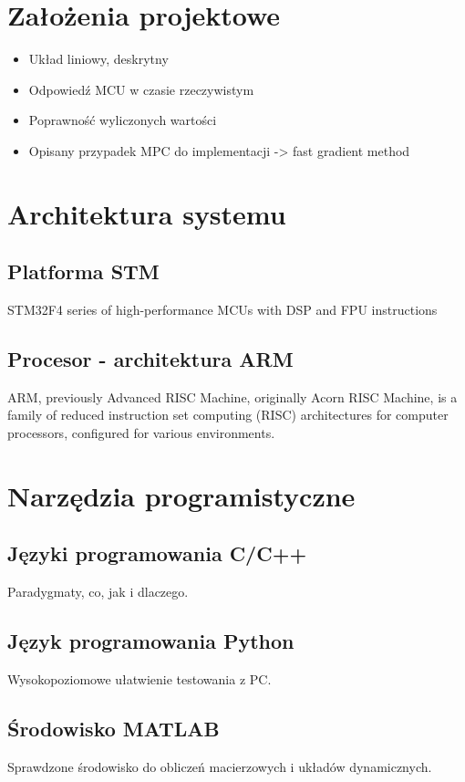 \section{Założenia projektowe} \label{sec:assumptions}
\begin{itemize}
	\item Układ liniowy, deskrytny
	\item Odpowiedź MCU w czasie rzeczywistym
    \item Poprawność wyliczonych wartości
    \item Opisany przypadek MPC do implementacji -> fast gradient method
\end{itemize}

\section{Architektura systemu} \label{sec:system}

\subsection{Platforma STM} \label{sec:stm}
STM32F4 series of high-performance MCUs with DSP and FPU instructions

\subsection{Procesor - architektura ARM} \label{sec:arm}
ARM, previously Advanced RISC Machine, originally Acorn RISC Machine, is a family of reduced
instruction set computing (RISC) architectures for computer processors, configured for various
environments.

\section{Narzędzia programistyczne} \label{sec:prog}

\subsection{Języki programowania C/C++} \label{sec:cpp}
Paradygmaty, co, jak i dlaczego.

\subsection{Język programowania Python} \label{sec:python}
Wysokopoziomowe ułatwienie testowania z PC.

\subsection{Środowisko MATLAB} \label{sec:matlab}
Sprawdzone środowisko do obliczeń macierzowych i układów dynamicznych.

